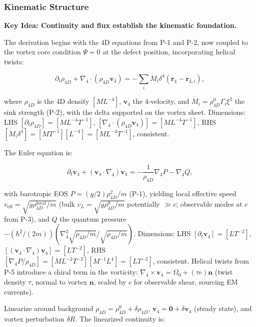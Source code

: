 \subsubsection{Kinematic Structure}

\textbf{Key Idea: Continuity and flux establish the kinematic foundation.}

The derivation begins with the 4D equations from P-1 and P-2, now coupled to the vortex core condition $\Psi=0$ at the defect position, incorporating helical twists:

\begin{equation}
\partial_t \rho_{4D} + \nabla_4 \cdot (\rho_{4D} \mathbf{v}_4) = -\sum_i \dot{M}_i \delta^4(\mathbf{r}_4 - \mathbf{r}_{4,i}),
\end{equation}

where $\rho_{4D}$ is the 4D density $[M L^{-4}]$, $\mathbf{v}_4$ the 4-velocity, and $\dot{M}_i = \rho_{4D}^0 \Gamma_i \xi^2$ the sink strength (P-2), with the delta supported on the vortex sheet. Dimensions: LHS $[\partial_t \rho_{4D}] = [M L^{-4} T^{-1}]$, $[\nabla_4 \cdot (\rho_{4D} \mathbf{v}_4)] = [M L^{-4} T^{-1}]$, RHS $[\dot{M}_i \delta^4] = [M T^{-1}] [L^{-4}] = [M L^{-4} T^{-1}]$, consistent.

The Euler equation is:

\begin{equation}
\partial_t \mathbf{v}_4 + (\mathbf{v}_4 \cdot \nabla_4) \mathbf{v}_4 = -\frac{1}{\rho_{4D}} \nabla_4 P - \nabla_4 Q,
\end{equation}

with barotropic EOS $P = (g/2) \rho_{4D}^2 / m$ (P-1), yielding local effective speed $v_{\text{eff}} = \sqrt{g \rho_{4D}^{\text{local}} / m}$ (bulk $v_L = \sqrt{g \rho_{4D}^0 / m}$ potentially $\gg c$; observable modes at $c$ from P-3), and $Q$ the quantum pressure $-(\hbar^2 / (2m)) (\nabla_4^2 \sqrt{\rho_{4D}/m} / \sqrt{\rho_{4D}/m})$. Dimensions: LHS $[\partial_t \mathbf{v}_4] = [L T^{-2}]$, $[(\mathbf{v}_4 \cdot \nabla_4) \mathbf{v}_4] = [L T^{-2}]$, RHS $[\nabla_4 P / \rho_{4D}] = [M L^{-2} T^{-2}] [M^{-1} L^{4}] = [L T^{-2}]$, consistent. Helical twists from P-5 introduce a chiral term in the vorticity: $\nabla_4 \times \mathbf{v}_4 = \Omega_0 + (\tau c) \mathbf{n}$ (twist density $\tau$, normal to vortex $\mathbf{n}$, scaled by $c$ for observable shear, sourcing EM currents).

Linearize around background $\rho_{4D} = \rho_{4D}^0 + \delta \rho_{4D}$, $\mathbf{v}_4 = \mathbf{0} + \delta \mathbf{v}_4$ (steady state), and vortex perturbation $\delta R$. The linearized continuity is:

